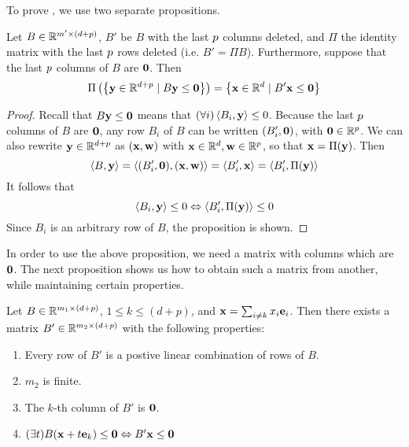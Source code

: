To prove , we use two separate propositions.
\begin{Prop}\label{proj_0_columns}
	Let $B\in\mathbb{R}^{m'\times(d+p)}$, $B'$ be $B$ with the last $p$ columns deleted, and $\Pi$ the identity matrix with the last $p$ rows deleted (i.e. $B' = \Pi B$).  Furthermore, suppose that the last $p$ columns of $B$ are $\mathbf{0}$.  Then
	\[ \Pi\left(\left\{\mathbf{y} \in \mathbb{R}^{d+p} \;|\; B\mathbf{y} \leq \mathbf{0}\right\}\right) =
		\left\{\mathbf{x}\in\mathbb{R}^d\;|\; B'\mathbf{x}\leq\mathbf{0}\right\} \]
\end{Prop}

\begin{proof}
	Recall that $B\mathbf{y} \leq \mathbf{0}$ means that $(\forall i)\left\langle B_i, \mathbf{y} \right\rangle \leq 0$.  Because the last $p$ columns of $B$ are $\mathbf{0}$, any row $B_i$ of $B$ can be written $(B'_i,\mathbf{0})$, with $\mathbf{0} \in \mathbb{R}^p$.  We can also rewrite $\mathbf{y}\in\mathbb{R}^{d+p}$ as $(\mathbf{x},\mathbf{w})$ with $\mathbf{x}\in\mathbb{R}^d,\mathbf{w}\in\mathbb{R}^p$, so that $\mathbf{x} = \Pi(\mathbf{y})$.  Then
	\[ \left\langle B, \mathbf{y} \right\rangle = \left\langle (B'_i,\mathbf{0}), (\mathbf{x},\mathbf{w}) \right\rangle = \left\langle B'_i, \mathbf{x} \right\rangle = \left\langle B'_i, \Pi(\mathbf{y}) \right\rangle \]
	It follows that
	\[ \left\langle B_i, \mathbf{y} \right\rangle \leq 0 \Leftrightarrow \left\langle B'_i, \Pi(\mathbf{y}) \right\rangle \leq 0 \]
	Since $B_i$ is an arbitrary row of $B$, the proposition is shown.
\end{proof}

In order to use the above proposition, we need a matrix with columns which are $\mathbf{0}$.  The next proposition shows us how to obtain such a matrix from another, while maintaining certain properties.

\begin{Prop}\label{fm_hcone}
	Let $B \in \mathbb{R}^{m_1\times (d+p)}$, $1 \leq k \leq (d+p)$, and $\mathbf{x} = \sum_{i\neq k}x_i \mathbf{e}_i$.  Then there exists a matrix $B' \in \mathbb{R}^{m_2\times (d+p)}$ with the following properties:
	\begin{enumerate}
		\item Every row of $B'$ is a postive linear combination of rows of $B$.
		\item $m_2$ is finite.
		\item The $k$-th column of $B'$ is $\mathbf{0}$.
		\item \((\exists t)B(\mathbf{x} + t\mathbf{e}_k) \leq \mathbf{0} \Leftrightarrow B'\mathbf{x} \leq \mathbf{0}\)
	\end{enumerate}
\end{Prop}

